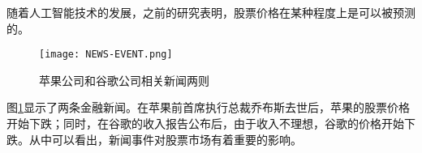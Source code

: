 随着人工智能技术的发展，之前的研究表明，股票价格在某种程度上是可以被预测的。
\begin{figure}[ht]
	\centering 
	\texttt{[image: NEWS-EVENT.png]}
	\caption{苹果公司和谷歌公司相关新闻两则}
	\label{fig:stock-event}
\end{figure}
图\ref{fig:stock-event}显示了两条金融新闻。在苹果前首席执行总裁乔布斯去世后，苹果的股票价格开始下跌；同时，在谷歌的收入报告公布后，由于收入不理想，谷歌的价格开始下跌。从中可以看出，新闻事件对股票市场有着重要的影响。

